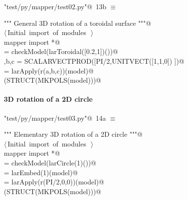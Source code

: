 \documentclass[11pt,oneside]{article}	%
\begin{document}
\begin{flushleft} \small \label{scrap30}
\protect{}\verb@"test/py/mapper/test02.py"@\nobreak\ {\footnotesize 13b }$\equiv$
\vspace{-1ex}
\begin{list}{}{} \item
\mbox{}\verb@""" General 3D rotation of a toroidal surface """@\\
\mbox{}\verb@@\hbox{$\langle\,$Initial import of modules\nobreak\ {\footnotesize {}}$\,\rangle$}\verb@@\\
\mbox{}\verb@from mapper import *@\\
\mbox{}\verb@model = checkModel(larToroidal([0.2,1])())@\\
\mbox{}\verb@a,b,c = SCALARVECTPROD([PI/2,UNITVECT([1,1,0]) ])@\\
\mbox{}\verb@model = larApply(r(a,b,c))(model)@\\
\mbox{}\verb@VIEW(STRUCT(MKPOLS(model)))@\\
\mbox{}\verb@@{\NWsep}
\end{list}
\vspace{-2ex}
\end{flushleft}


\paragraph{3D rotation of a 2D circle}

\begin{flushleft} \small \label{scrap31}
\protect{}\verb@"test/py/mapper/test03.py"@\nobreak\ {\footnotesize 14a }$\equiv$
\vspace{-1ex}
\begin{list}{}{} \item
\mbox{}\verb@""" Elementary 3D rotation of a 2D circle """@\\
\mbox{}\verb@@\hbox{$\langle\,$Initial import of modules\nobreak\ {\footnotesize {}}$\,\rangle$}\verb@@\\
\mbox{}\verb@from mapper import *@\\
\mbox{}\verb@model = checkModel(larCircle(1)())@\\
\mbox{}\verb@model = larEmbed(1)(model)@\\
\mbox{}\verb@model = larApply(r(PI/2,0,0))(model)@\\
\mbox{}\verb@VIEW(STRUCT(MKPOLS(model)))@\\
\mbox{}\verb@@{\NWsep}
\end{list}
\vspace{-2ex}
\end{flushleft}
\end{document}
